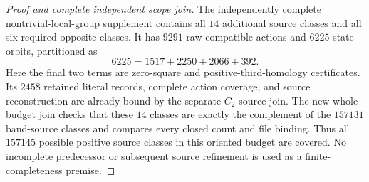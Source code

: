 \begin{proof}[Proof and complete independent scope join]
The independently complete nontrivial-local-group supplement contains
all $14$ additional source classes and all six required opposite
classes.  It has $9291$ raw compatible actions and $6225$ state orbits,
partitioned as
\[
 6225=1517+2250+2066+392.
\]
Here the final two terms are zero-square and positive-third-homology
certificates.  Its $2458$ retained literal records, complete action
coverage, and source reconstruction are already bound by the separate
$C_2$-source join.  The new whole-budget join checks that these $14$
classes are exactly the complement of the $157131$ band-source
classes and compares every closed count and file binding.
Thus all $157145$ possible positive source classes in this oriented
budget are covered.  No incomplete predecessor or subsequent source
refinement is used as a finite-completeness premise.
\end{proof}
